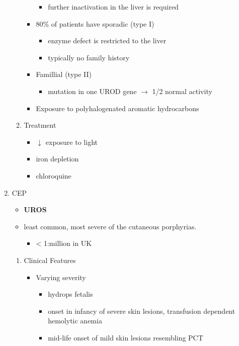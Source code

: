 \documentclass{scrartcl}
\begin{document}
\begin{enumerate}
\begin{enumerate}
\begin{itemize}
\begin{itemize}
\item further inactivation in the liver is required
\end{itemize}
\item 80\% of patients have sporadic (type I)
\begin{itemize}
\item enzyme defect is restricted to the liver
\item typically no family history
\end{itemize}
\item Famillial (type II)
\begin{itemize}
\item mutation in one UROD gene \(\to\) 1/2 normal activity
\end{itemize}
\item Exposure to polyhalogenated aromatic hydrocarbons
\end{itemize}
\item Treatment
\label{sec:orgffbebce}
\begin{itemize}
\item \(\downarrow\) exposure to light
\item iron depletion
\item chloroquine
\end{itemize}
\end{enumerate}
\item CEP
\label{sec:orgc321b20}
\begin{itemize}
\item \textbf{UROS}
\item least common, most severe of the cutaneous porphyrias.
\begin{itemize}
\item < 1:million in UK
\end{itemize}
\end{itemize}
\begin{enumerate}
\item Clinical Features
\label{sec:org503b281}
\begin{itemize}
\item Varying severity
\begin{itemize}
\item hydrops fetalis
\item onset in infancy of severe skin lesions, transfusion dependent
hemolytic anemia
\item mid-life onset of mild skin lesions resembling PCT
\end{itemize}

\end{itemize}
\end{enumerate}
\end{enumerate}
\end{document}
